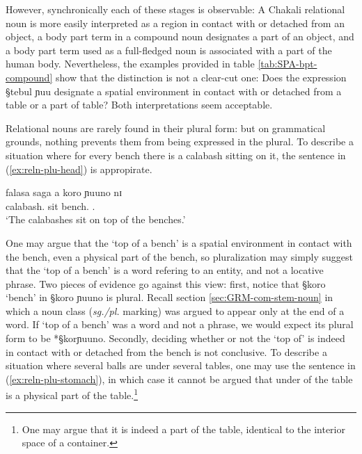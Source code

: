 However, synchronically each of these stages is observable: A  Chakali 
relational noun is more easily interpreted as  a region in contact with or
detached from an object, a body part term in a compound
noun designates
a part of an object, and a body part term used as
a full-fledged noun is associated with a part of the human body. 
Nevertheless, the examples provided in table \ref{tab:SPA-bpt-compound} show
that the distinction is not a clear-cut one: Does the expression {\S tebul ɲuu}
designate a spatial environment  in contact with or detached from a table or  a
part of table? Both interpretations seem acceptable.

Relational nouns
are rarely found in their plural form: but on grammatical grounds, nothing
prevents them from being expressed in the plural. 
To describe a situation where  for every bench there is a calabash sitting on
it, 
the sentence in (\ref{ex:reln-plu-head}) is appropirate.


\begin{exe}
\ex\label{ex:reln-plu-head}
\gll falasa saga a koro ɲuuno nɪ \\
calabash.{\pl}  sit {\art} bench.{\pl}  {\reln .\pl} {\postp}\\
\glt `The calabashes sit on top of the benches.' 
\end{exe} 

One may argue that the `top of a bench' is a spatial environment  in contact
with the bench, even a physical part of the bench, so pluralization may simply
suggest that the   `top of a bench' is a word refering to an entity,  and not a
locative phrase. Two pieces of evidence go against this view: first,  notice
that {\S koro} `bench'  in {\S koro ɲuuno} is plural.  Recall section
\ref{sec:GRM-com-stem-noun} in which a noun class ({\it sg./pl.} marking) was
argued to  appear only at the end of a word. If  `top of a bench' was a word and
not a phrase, we would expect its plural form to be  *{\S korɲuuno}. Secondly, 
deciding whether or not the `top of' is indeed in contact with or detached from
the bench is not conclusive. To describe a situation where several balls are
under several tables, one may use the sentence in (\ref{ex:reln-plu-stomach}), 
in which case it cannot be argued that  under of the table is a physical part of
the table.\footnote{One may argue that it is indeed a part of the table,
identical to the interior space of a container.}

